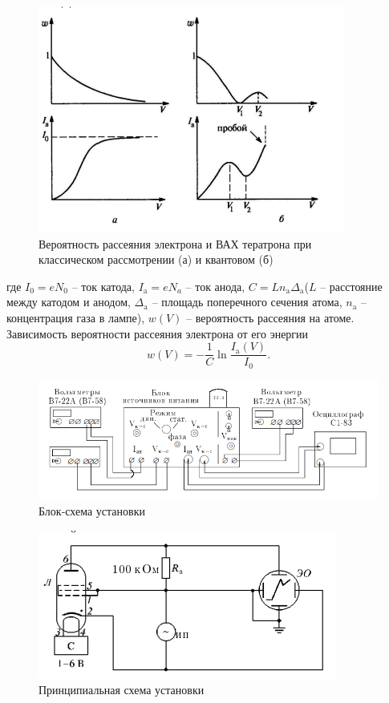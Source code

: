 \documentclass[a4paper, 12pt]{article}%
\begin{document}
	\begin{figure}[H]
		\centering
		\includegraphics[width=0.6\linewidth]{compare}
		\caption{Вероятность рассеяния электрона и ВАХ тератрона при классическом рассмотрении (а) и квантовом (б)}
	\end{figure}
	где $I_0 = eN_0$ -- ток катода, $I_\text{a} = eN_a$ -- ток анода, $C = Ln_\text{a} \Delta_\text{a}$($L$ --  расстояние между катодом и анодом, $\Delta_\text{a}$ -- площадь поперечного сечения атома, $n_\text{a}$ -- концентрация газа в лампе), $w(V)$ -- вероятность рассеяния на атоме.
	Зависимость вероятности рассеяния электрона от его энергии
	\[\tag{5a}\label{5a}
	w(V) = -\dfrac{1}{C}\ln \dfrac{I_\text{a}(V)}{I_0}.
	\]
	
	\begin{figure}[H]
		\centering
		\includegraphics[width=1\linewidth]{ust1}
		\caption{Блок-схема установки}
	\end{figure}

	\begin{figure}[H]
		\centering
		\includegraphics[width=0.6\linewidth]{ust}
		\caption{Принципиальная схема установки}
	\end{figure}
	
\end{document}
